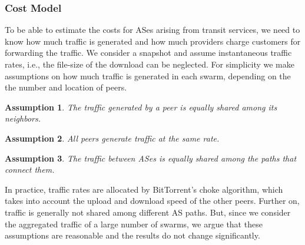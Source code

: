 
\subsubsection{Cost Model}

To be able to estimate the costs for ASes arising from transit services, we need to know how much traffic is generated and how much providers charge customers for forwarding the traffic.
We consider a snapshot and assume instantaneous traffic rates, i.e., the file-size of the download can be neglected.
For simplicity we make assumptions on how much traffic is generated in each swarm, depending on the the number and location of peers.
\newtheorem{assa}{Assumption}\begin{assa}\label{npeers}
The traffic generated by a peer is equally shared among its neighbors.
\end{assa}
\newtheorem{assb}[assa]{Assumption}\begin{assb}\label{ntraffic}
All peers generate traffic at the same rate.
\end{assb}
\newtheorem{assc}[assa]{Assumption}\begin{assc}\label{npaths}
The traffic between ASes is equally shared among the paths that connect them.
\end{assc}
In practice, traffic rates are allocated by BitTorrent's choke algorithm, which takes into account the upload and download speed of the other peers. Further on, traffic is generally not shared among different AS paths. But, since we consider the aggregated traffic of a large number of swarms, we argue that these assumptions are reasonable and the results do not change significantly.
